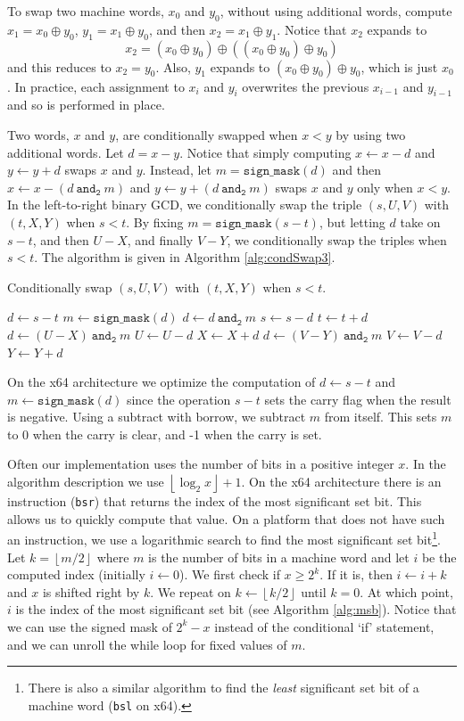 \documentclass{ucalgthes1}
\theoremstyle{definition}
\newcommand{\floor}[1]{\left\lfloor #1 \right\rfloor}
\newcommand{\band}{~\texttt{and}_\texttt{2}~}
\newcommand{\bxor}{\oplus}
\begin{document}
To swap two machine words, $x_0$ and $y_0$, without using additional words, compute $x_1 = x_0 \bxor y_0$, $y_1 = x_1 \bxor y_0$, and then $x_2 = x_1 \bxor y_1$.  Notice that $x_2$ expands to
\[
	x_2 = (x_0 \bxor y_0) \bxor ((x_0 \bxor y_0) \bxor y_0)
\]
and this reduces to $x_2 = y_0$.  Also, $y_1$ expands to $(x_0 \bxor y_0) \bxor y_0$, which is just $x_0$.  In practice, each assignment to $x_i$ and $y_i$ overwrites the previous $x_{i-1}$ and $y_{i-1}$ and so is performed in place.

Two words, $x$ and $y$, are conditionally swapped when $x < y$ by using two additional words.  Let $d = x - y$.  Notice that simply computing $x \gets x - d$ and $y \gets y + d$ swaps $x$ and $y$.  Instead, let $m = \texttt{sign\_mask}(d)$ and then  $x \gets x - (d \band m)$ and $y \gets y + (d \band m)$ swaps $x$ and $y$ only when $x < y$.  In the left-to-right binary GCD, we conditionally swap the triple $(s, U, V)$ with $(t, X, Y)$ when $s < t$.  By fixing $m = \texttt{sign\_mask}(s - t)$, but letting $d$ take on $s - t$, and then $U - X$, and finally $V - Y$, we conditionally swap the triples when $s < t$. The algorithm is given in Algorithm \ref{alg:condSwap3}.
\begin{algorithm}[h]
\caption{Conditionally swap $(s, U, V)$ with $(t, X, Y)$ when $s < t$.}
\label{alg:condSwap3}
\begin{algorithmic}[1]
\STATE $d \gets s - t$
\STATE $m \gets \texttt{sign\_mask}(d)$
\STATE $d \gets d \band m$
\STATE $s \gets s - d$
\STATE $t \gets t + d$
\STATE $d \gets (U - X) \band m$
\STATE $U \gets U - d$
\STATE $X \gets X + d$
\STATE $d \gets (V - Y) \band m$
\STATE $V \gets V - d$
\STATE $Y \gets Y + d$
\end{algorithmic}
\end{algorithm}
On the x64 architecture we optimize the computation of $d \gets s - t$ and $m \gets \texttt{sign\_mask}(d)$ since the operation $s-t$ sets the carry flag when the result is negative.  Using a subtract with borrow, we subtract $m$ from itself.  This sets $m$ to 0 when the carry is clear, and -1 when the carry is set.

Often our implementation uses the number of bits in a positive integer $x$.  In the algorithm description we use $\floor{\log_2x} + 1$.  On the x64 architecture there is an instruction (\texttt{bsr}) that returns the index of the most significant set bit.  This allows us to quickly compute that value.  On a platform that does not have such an instruction, we use a logarithmic search to find the most significant set bit\footnote{There is also a similar algorithm to find the \emph{least} significant set bit of a machine word (\texttt{bsl} on x64).}.  Let $k = \floor{m/2}$ where $m$ is the number of bits in a machine word and let $i$ be the computed index (initially $i \gets 0$).  We first check if $x \ge 2^k$.  If it is, then $i \gets i + k$ and $x$ is shifted right by $k$.  We repeat on $k \gets \floor{k/2}$ until $k=0$.  At which point, $i$ is the index of the most significant set bit (see Algorithm \ref{alg:msb}).  Notice that we can use the signed mask of $2^k - x$ instead of the conditional `if' statement, and we can unroll the while loop for fixed values of $m$.
\end{document}
